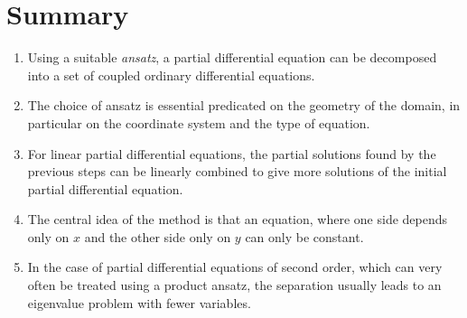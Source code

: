 \section{Summary}
\begin{enumerate}
\item
Using a suitable {\em ansatz}, a partial differential equation can be
decomposed into a set of coupled ordinary differential equations.
\item
The choice of ansatz is essential predicated on the geometry of the
domain, in particular on the coordinate system and the type of equation.
\item
For linear partial differential equations, the partial solutions found
by the previous steps can be linearly combined to give more solutions
of the initial partial differential equation.
\item
The central idea of the method is that an equation, where one side
depends only on $x$ and the other side only on $y$ can only be constant.
\item
In the case of partial differential equations of second order,
which can very often be treated using a product ansatz, the separation
usually leads to an eigenvalue problem with fewer variables.
\end{enumerate}



